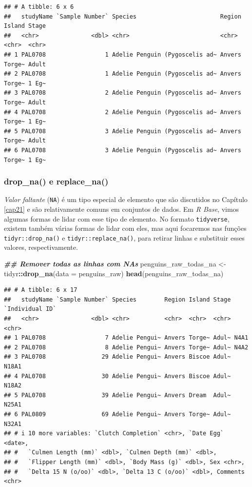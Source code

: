 \documentclass[
]{article}
\newenvironment{Shaded}{\begin{snugshade}}{\end{snugshade}}
\newcommand{\AttributeTok}[1]{\textcolor[rgb]{0.13,0.29,0.53}{#1}}
\newcommand{\DocumentationTok}[1]{\textcolor[rgb]{0.56,0.35,0.01}{\textbf{\textit{#1}}}}
\newcommand{\FunctionTok}[1]{\textcolor[rgb]{0.13,0.29,0.53}{\textbf{#1}}}
\newcommand{\NormalTok}[1]{#1}
\newcommand{\OtherTok}[1]{\textcolor[rgb]{0.56,0.35,0.01}{#1}}
\newcommand{\SpecialCharTok}[1]{\textcolor[rgb]{0.81,0.36,0.00}{\textbf{#1}}}
\begin{document}
\begin{verbatim}
## # A tibble: 6 x 6
##   studyName `Sample Number` Species                        Region Island Stage
##   <chr>               <dbl> <chr>                          <chr>  <chr>  <chr>
## 1 PAL0708                 1 Adelie Penguin (Pygoscelis ad~ Anvers Torge~ Adult
## 2 PAL0708                 1 Adelie Penguin (Pygoscelis ad~ Anvers Torge~ 1 Eg~
## 3 PAL0708                 2 Adelie Penguin (Pygoscelis ad~ Anvers Torge~ Adult
## 4 PAL0708                 2 Adelie Penguin (Pygoscelis ad~ Anvers Torge~ 1 Eg~
## 5 PAL0708                 3 Adelie Penguin (Pygoscelis ad~ Anvers Torge~ Adult
## 6 PAL0708                 3 Adelie Penguin (Pygoscelis ad~ Anvers Torge~ 1 Eg~
\end{verbatim}

\hypertarget{drop_na-e-replace_na}{%
\subsubsection{drop\_na() e replace\_na()}\label{drop_na-e-replace_na}}

\emph{Valor faltante} (\texttt{NA}) é um tipo especial de elemento que são discutidos no Capítulo \ref{cap21} e são relativamente comuns em conjuntos de dados. Em \emph{R Base}, vimos algumas formas de lidar com esse tipo de elemento. No formato \texttt{tidyverse}, existem também várias formas de lidar com eles, mas aqui focaremos nas funções \texttt{tidyr::drop\_na()} e \texttt{tidyr::replace\_na()}, para retirar linhas e substituir esses valores, respectivamente.

\begin{Shaded}
\begin{Highlighting}[]
\DocumentationTok{\#\# Remover todas as linhas com NAs}
\NormalTok{penguins\_raw\_todas\_na }\OtherTok{\textless{}{-}}\NormalTok{ tidyr}\SpecialCharTok{::}\FunctionTok{drop\_na}\NormalTok{(}\AttributeTok{data =}\NormalTok{ penguins\_raw)}
\FunctionTok{head}\NormalTok{(penguins\_raw\_todas\_na)}
\end{Highlighting}
\end{Shaded}

\begin{verbatim}
## # A tibble: 6 x 17
##   studyName `Sample Number` Species        Region Island Stage `Individual ID`
##   <chr>               <dbl> <chr>          <chr>  <chr>  <chr> <chr>          
## 1 PAL0708                 7 Adelie Pengui~ Anvers Torge~ Adul~ N4A1           
## 2 PAL0708                 8 Adelie Pengui~ Anvers Torge~ Adul~ N4A2           
## 3 PAL0708                29 Adelie Pengui~ Anvers Biscoe Adul~ N18A1          
## 4 PAL0708                30 Adelie Pengui~ Anvers Biscoe Adul~ N18A2          
## 5 PAL0708                39 Adelie Pengui~ Anvers Dream  Adul~ N25A1          
## 6 PAL0809                69 Adelie Pengui~ Anvers Torge~ Adul~ N32A1          
## # i 10 more variables: `Clutch Completion` <chr>, `Date Egg` <date>,
## #   `Culmen Length (mm)` <dbl>, `Culmen Depth (mm)` <dbl>,
## #   `Flipper Length (mm)` <dbl>, `Body Mass (g)` <dbl>, Sex <chr>,
## #   `Delta 15 N (o/oo)` <dbl>, `Delta 13 C (o/oo)` <dbl>, Comments <chr>
\end{verbatim}
\end{document}
